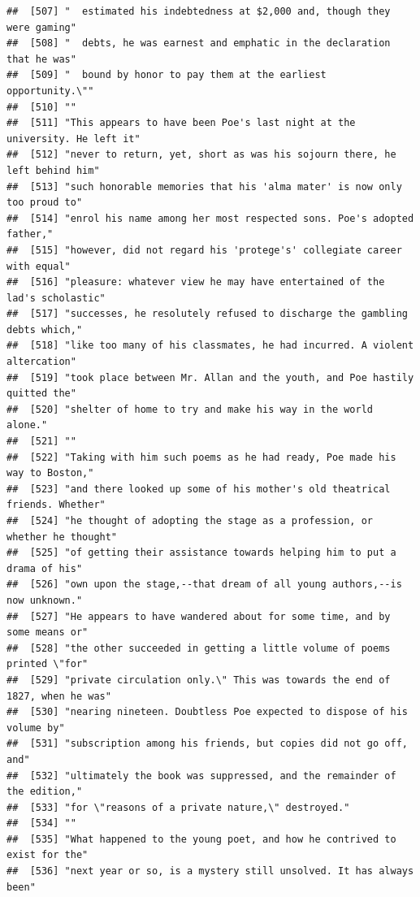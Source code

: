 \documentclass{article}\usepackage[]{graphicx}\usepackage[]{color}
\makeatletter
\newenvironment{kframe}{%
 \def\at@end@of@kframe{}%
 \ifinner\ifhmode%
  \def\at@end@of@kframe{\end{minipage}}%
  \begin{minipage}{\columnwidth}%
 \fi\fi%
 \def\FrameCommand##1{\hskip\@totalleftmargin \hskip-\fboxsep
 \colorbox{shadecolor}{##1}\hskip-\fboxsep
     \hskip-\linewidth \hskip-\@totalleftmargin \hskip\columnwidth}%
 \MakeFramed {\advance\hsize-\width
   \@totalleftmargin\z@ \linewidth\hsize
   \@setminipage}}%
 {\par\unskip\endMakeFramed%
 \at@end@of@kframe}
\newenvironment{knitrout}{}{} %
\makeatother
\begin{document}
\begin{knitrout}
\begin{kframe}
\begin{verbatim}
##  [507] "  estimated his indebtedness at $2,000 and, though they were gaming"         
##  [508] "  debts, he was earnest and emphatic in the declaration that he was"         
##  [509] "  bound by honor to pay them at the earliest opportunity.\""                 
##  [510] ""                                                                            
##  [511] "This appears to have been Poe's last night at the university. He left it"    
##  [512] "never to return, yet, short as was his sojourn there, he left behind him"    
##  [513] "such honorable memories that his 'alma mater' is now only too proud to"      
##  [514] "enrol his name among her most respected sons. Poe's adopted father,"         
##  [515] "however, did not regard his 'protege's' collegiate career with equal"        
##  [516] "pleasure: whatever view he may have entertained of the lad's scholastic"     
##  [517] "successes, he resolutely refused to discharge the gambling debts which,"     
##  [518] "like too many of his classmates, he had incurred. A violent altercation"     
##  [519] "took place between Mr. Allan and the youth, and Poe hastily quitted the"     
##  [520] "shelter of home to try and make his way in the world alone."                 
##  [521] ""                                                                            
##  [522] "Taking with him such poems as he had ready, Poe made his way to Boston,"     
##  [523] "and there looked up some of his mother's old theatrical friends. Whether"    
##  [524] "he thought of adopting the stage as a profession, or whether he thought"     
##  [525] "of getting their assistance towards helping him to put a drama of his"       
##  [526] "own upon the stage,--that dream of all young authors,--is now unknown."      
##  [527] "He appears to have wandered about for some time, and by some means or"       
##  [528] "the other succeeded in getting a little volume of poems printed \"for"       
##  [529] "private circulation only.\" This was towards the end of 1827, when he was"   
##  [530] "nearing nineteen. Doubtless Poe expected to dispose of his volume by"        
##  [531] "subscription among his friends, but copies did not go off, and"              
##  [532] "ultimately the book was suppressed, and the remainder of the edition,"       
##  [533] "for \"reasons of a private nature,\" destroyed."                             
##  [534] ""                                                                            
##  [535] "What happened to the young poet, and how he contrived to exist for the"      
##  [536] "next year or so, is a mystery still unsolved. It has always been"            

\end{verbatim}
\end{kframe}
\end{knitrout}
\end{document}
